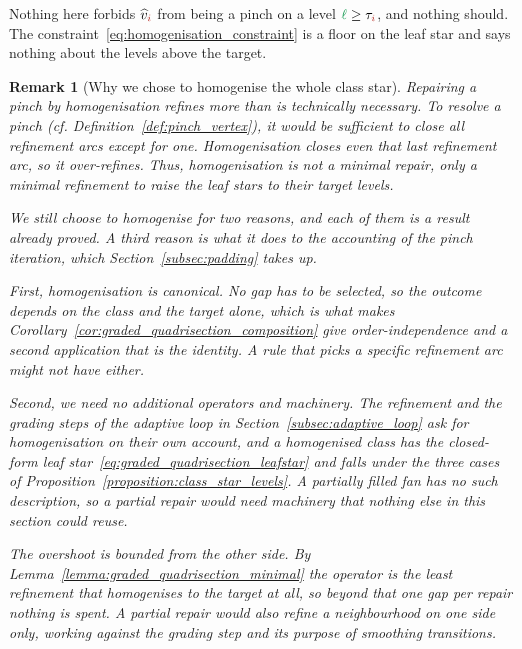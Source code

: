 \documentclass[a4paper, 12pt]{article}
\newcommand{\targetlevel}{\tau}                                 %
\newcommand{\green}{\color{ForestGreen}}
\newcommand{\brickred}{\color{BrickRed}}
\newcommand{\vertexClass}[1]{\widehat{v}_{#1}}
\newcommand{\coarseIdxone}{{\brickred i}}
\renewcommand{\l}{{\green\ell}}
\newtheorem{remark}[theorem]{Remark}
\theoremstyle{definition}
\theoremstyle{plain}
\numberwithin{equation}{section}
\begin{document}
Nothing here forbids $\vertexClass{\coarseIdxone}$ from being a pinch on a level $\l \geq \targetlevel_\coarseIdxone$, and nothing should. The constraint~\eqref{eq:homogenisation_constraint} is a floor on the leaf star and says nothing about the levels above the target.

\begin{remark}[Why we chose to homogenise the whole class star]
    \label{rem:pinch_repair_choice}
    Repairing a pinch by homogenisation refines more than is technically necessary. To resolve a pinch (cf. Definition~\ref{def:pinch_vertex}), it would be sufficient to close all refinement arcs except for one. Homogenisation closes even that last refinement arc, so it over-refines. Thus, homogenisation is not a minimal repair, only a minimal refinement to raise the leaf stars to their target levels.

    We still choose to homogenise for two reasons, and each of them is a result already proved. A third reason is what it does to the accounting of the pinch iteration, which Section~\ref{subsec:padding} takes up.

    First, homogenisation is canonical. No gap has to be selected, so the outcome depends on the class and the target alone, which is what makes Corollary~\ref{cor:graded_quadrisection_composition} give order-independence and a second application that is the identity. A rule that picks a specific refinement arc might not have either.

    Second, we need no additional operators and machinery. The refinement and the grading steps of the adaptive loop in Section~\ref{subsec:adaptive_loop} ask for homogenisation on their own account, and a homogenised class has the closed-form leaf star~\eqref{eq:graded_quadrisection_leafstar} and falls under the three cases of Proposition~\ref{proposition:class_star_levels}. A partially filled fan has no such description, so a partial repair would need machinery that nothing else in this section could reuse.

    The overshoot is bounded from the other side. By Lemma~\ref{lemma:graded_quadrisection_minimal} the operator is the least refinement that homogenises to the target at all, so beyond that one gap per repair nothing is spent. A partial repair would also refine a neighbourhood on one side only, working against the grading step and its purpose of smoothing transitions.
\end{remark}
\end{document}
